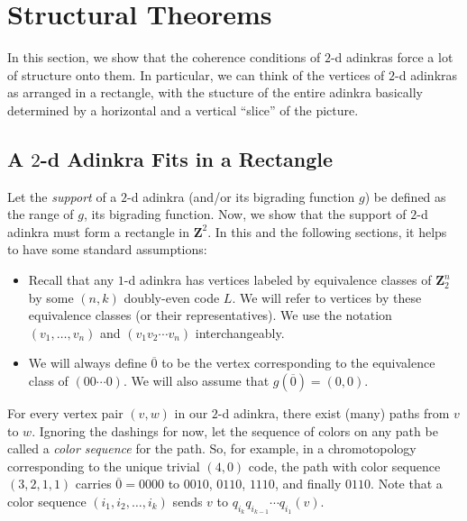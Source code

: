 \documentclass[12pt,twoside,singlespace]{article}
\numberwithin{equation}{section}
\theoremstyle{definition}
\newcommand{\ZZ}{\mathbf{Z}}
\begin{document}
\section{Structural Theorems}

In this section, we show that the coherence conditions of $2$-d adinkras force a lot of structure onto them. In particular, we can think of the vertices of $2$-d adinkras as arranged in a rectangle, with the stucture of the entire adinkra basically determined by a horizontal and a vertical ``slice'' of the picture.

\subsection{A $2$-d Adinkra Fits in a Rectangle}

Let the \emph{support} of a $2$-d adinkra (and/or its bigrading function $g$) be defined as the range of $g$, its bigrading function. Now, we show that the support of $2$-d adinkra must form a rectangle in $\ZZ^2$. In this and the following sections, it helps to have some standard assumptions:

\begin{itemize}
\item Recall that any $1$-d adinkra has vertices labeled by equivalence classes of $\ZZ_2^n$ by some $(n,k)$ doubly-even code $L$. We will refer to vertices by these equivalence classes (or their representatives). We use the notation $(v_1, \ldots, v_n)$ and $(v_1 v_2 \cdots v_n)$ interchangeably.
\item We will always define $\overline{0}$ to be the vertex corresponding to the equivalence class of $(00\cdots0)$. We will also assume that $g(\overline{0}) = (0,0)$. 
\end{itemize}

For every vertex pair $(v,w)$ in our $2$-d adinkra, there exist (many) paths from $v$ to $w$. Ignoring the dashings for now, let the sequence of colors on any path be called a \emph{color sequence} for the path. So, for example, in a chromotopology corresponding to the unique trivial $(4,0)$ code, the path with color sequence $(3,2,1,1)$ carries $\overline{0} = 0000$ to $0010$, $0110$, $1110$, and finally $0110$. Note that a color sequence $(i_1, i_2, \ldots, i_k)$ sends $v$ to $q_{i_k} q_{i_{k-1}} \cdots q_{i_1} (v)$.
\end{document}
